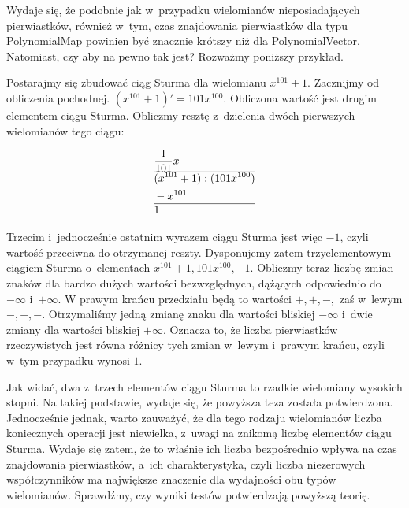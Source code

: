 Wydaje się, że podobnie jak w~przypadku wielomianów nieposiadających pierwiastków, również w~tym, czas znajdowania pierwiastków dla typu PolynomialMap powinien być znacznie krótszy niż dla PolynomialVector. Natomiast, czy aby na pewno tak jest? Rozważmy poniższy przykład.

Postarajmy się zbudować ciąg Sturma dla wielomianu $x^{101}+1$. Zacznijmy od obliczenia pochodnej. $(x^{101}+1)'=101x^{100}$.
Obliczona wartość jest drugim elementem ciągu Sturma. Obliczmy resztę z~dzielenia dwóch pierwszych wielomianów tego ciągu:

\begin{equation*}
\begin{split}
&\frac{1}{101}x \\
\hline
&(x^{101}+1) : (101x^{100}) \\
&-x^{101} \\
\hline
&1
\end{split}
\end{equation*}

Trzecim i~jednocześnie ostatnim wyrazem ciągu Sturma jest więc $-1$, czyli wartość przeciwna do otrzymanej reszty. Dysponujemy zatem trzyelementowym ciągiem Sturma o~elementach ${x^{101}+1, 101x^{100}, -1}$. Obliczmy teraz liczbę zmian znaków dla bardzo dużych wartości bezwzględnych, dążących odpowiednio do $-\infty$ i~$+\infty$. W prawym krańcu przedziału będą to wartości $+,+,-,$ zaś w~lewym $-,+,-.$ Otrzymaliśmy jedną zmianę znaku dla wartości bliskiej $-\infty$ i~dwie zmiany dla wartości bliskiej $+\infty$. Oznacza to, że liczba pierwiastków rzeczywistych jest równa różnicy tych zmian w~lewym i~prawym krańcu, czyli w~tym przypadku wynosi $1$.

Jak widać, dwa z~trzech elementów ciągu Sturma to rzadkie wielomiany wysokich stopni. Na takiej podstawie, wydaje się, że powyższa teza została potwierdzona. Jednocześnie jednak, warto zauważyć, że dla tego rodzaju wielomianów liczba koniecznych operacji jest niewielka, z~uwagi na znikomą liczbę elementów ciągu Sturma. Wydaje się zatem, że to właśnie ich liczba bezpośrednio wpływa na czas znajdowania pierwiastków, a~ich charakterystyka, czyli liczba niezerowych współczynników ma największe znaczenie dla wydajności obu typów wielomianów. Sprawdźmy, czy wyniki testów potwierdzają powyższą teorię.

